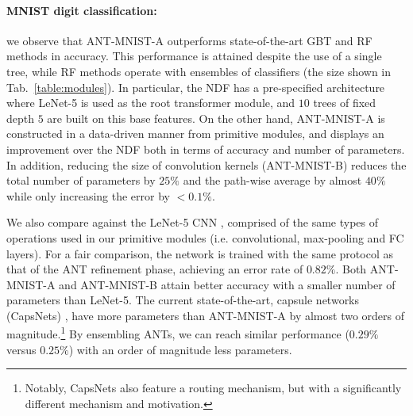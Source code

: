 
\paragraph{MNIST digit classification:} we observe that ANT-MNIST-A outperforms state-of-the-art GBT \cite{ponomareva2017compact} and RF \cite{zhou2017deepft} methods in accuracy. This performance is attained despite the use of a single tree, while RF methods operate with ensembles of classifiers (the size shown in Tab.~\ref{table:modules}). In particular, the NDF \cite{kontschieder2015deep} has a pre-specified architecture where LeNet-5 \cite{lecun1998gradient} is used as the root transformer module, and $10$ trees of fixed depth $5$ are built on this base features. On the other hand, ANT-MNIST-A is constructed in a data-driven manner from primitive modules, and displays an improvement over the NDF both in terms of accuracy and number of parameters. In addition, reducing the size of convolution kernels (ANT-MNIST-B) reduces the total number of parameters by $25\%$ and the path-wise average by almost $40\%$ while only increasing the error by $< 0.1\%$.

We also compare against the LeNet-5 CNN \cite{lecun1998gradient}, comprised of the same types of operations used in our primitive modules (i.e. convolutional, max-pooling and FC layers). For a fair comparison, the network is trained with the same protocol as that of the ANT refinement phase, achieving an error rate of $0.82\%$. Both ANT-MNIST-A and ANT-MNIST-B attain better accuracy with a smaller number of parameters than LeNet-5. The current state-of-the-art, capsule networks (CapsNets) \cite{sabour2017dynamic}, have more parameters than ANT-MNIST-A by almost two orders of magnitude.\footnote{Notably, CapsNets also feature a routing mechanism, but with a significantly different mechanism and motivation.} By ensembling ANTs, we can reach similar performance ($0.29\%$ versus $0.25\%$) with an order of magnitude less parameters.

